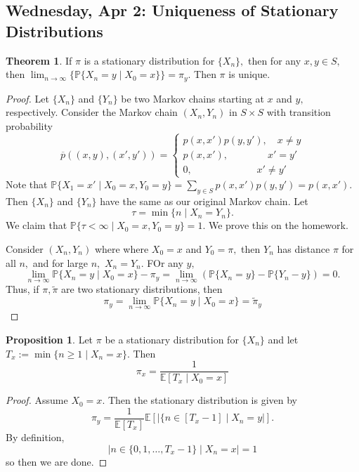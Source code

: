 \documentclass[10pt, oneside]{article}
\newcommand{\bbP}{\mathbb{P}}
\newcommand{\bbE}{\mathbb{E}}
\theoremstyle{definition}
\newtheorem{thm}{Theorem}
\newtheorem{prop}{Proposition}
\begin{document}
\newpage
\subsection{Wednesday, Apr 2: Uniqueness of Stationary Distributions}
\begin{thm}
    If $\pi$ is a stationary distribution for $\{X_n\},$ then for any $x,y \in S,$  then $\lim_{n\to \infty}\{\bbP\{X_n = y \mid X_0= x\}\} = \pi_y.$ Then $\pi$ is unique.
\end{thm}
\begin{proof}
    Let $\{X_n\}$ and $\{Y_n\}$ be two Markov chains starting at $x$ and $y,$ respectively. Consider the Markov chain $(X_n, Y_n)$ in $S\times S$ with transition probability \[\overline{p}((x,y), (x',y')) = \begin{cases}
        p(x,x')p(y,y'), \quad x\neq y\\
        p(x,x'), \qquad \qquad x' = y'\\
        0, \qquad \qquad \qquad \;\;x' \neq y'
    \end{cases}\]
    Note that $\bbP\{X_1 = x' \mid X_0 = x, Y_0 = y\} = \sum_{y \in S}p(x,x')p(y,y') = p(x,x').$ Then $\{X_n\}$ and $\{Y_n\}$ have the same as our original Markov chain. Let 
    \[\tau = \min\{n \mid X_n = Y_n\}.\] We claim that $\bbP\{\tau < \infty \mid X_0 = x, Y_0 = y\} = 1.$ We prove this on the homework. 

    Consider $(X_n, Y_n)$ where where $X_0 = x$ and $Y_0 = \pi,$ then $Y_n$ has distance $\pi$ for all $n,$ and for large $n,$ $X_n = Y_n.$ FOr any $y,$ 
    \[\lim_{n\to \infty}\bbP\{X_n = y \mid X_0 = x\} -\pi_ y = \lim_{n\to \infty}\left(\bbP\{X_n = y\} - \bbP\{Y_n - y\}\right) = 0.\]  Thus, if $\pi, \tilde{\pi}$ are two stationary distributions, then 
    \[\pi_y = \lim_{n\to \infty}\bbP\{X_n = y \mid X_0 = x\}= \tilde{\pi}_y\]
\end{proof}

\begin{prop}
    Let $\pi$ be a stationary distribution for $\{X_n\}$ and let $T_x:= \min\{n \geq 1 \mid X_n = x\}.$ Then 
    \[\pi_x = \frac{1}{\bbE[T_x \mid X_0 = x]}\]
\end{prop}
\begin{proof}
    Assume $X_0 =x.$ Then the stationary distribution is given by
    \[\pi_y = \frac{1}{\bbE[T_x]}\bbE[|\{n \in [T_x - 1] \mid X_n = y|].\] By definition, 
    \[|n \in \{0,1, \dots, T_x -1\}\mid X_n = x| = 1\] so then we are done.
\end{proof}
\end{document}
